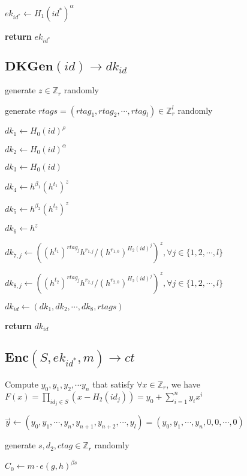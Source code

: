 \documentclass[a4paper]{article}
\begin{document}
$\textit{ek}_{\textit{id}^*} \gets H_1(\textit{id}^*)^\alpha$

\textbf{return} $\textit{ek}_{\textit{id}^*}$

\subsection{$\textbf{DKGen}(\textit{id}) \rightarrow \textit{dk}_\textit{id}$}

generate $z \in \mathbb{Z}_r$ randomly

generate $\textit{rtags} = (\textit{rtag}_1, \textit{rtag}_2, \cdots, \textit{rtag}_l) \in \mathbb{Z}_r^l$ randomly

$\textit{dk}_1 \gets H_0(\textit{id})^\rho$

$\textit{dk}_2 \gets H_0(\textit{id})^\alpha$

$\textit{dk}_3 \gets H_0(\textit{id})$

$\textit{dk}_4 \gets h^{\beta_1}(h^{t_1})^z$

$\textit{dk}_5 \gets h^{\beta_2}(h^{t_2})^z$

$\textit{dk}_6 \gets h^z$

$\textit{dk}_{7, j} \gets ((h^{t_1})^{\textit{rtag}_j}h^{r_{1, j}} / (h^{r_{1, 0}})^{H_2(\textit{id})^j})^z, \forall j \in \{1, 2, \cdots, l\}$

$\textit{dk}_{8, j} \gets ((h^{t_2})^{\textit{rtag}_j}h^{r_{2, j}} / (h^{r_{2, 0}})^{H_2(\textit{id})^j})^z, \forall j \in \{1, 2, \cdots, l\}$

$\textit{dk}_\textit{id} \gets (\textit{dk}_1, \textit{dk}_2, \cdots, \textit{dk}_8, \textit{rtags})$

\textbf{return} $\textit{dk}_\textit{id}$

\subsection{$\textbf{Enc}(S, \textit{ek}_{\textit{id}^*}, m) \rightarrow \textit{ct}$}

Compute $y_0, y_1, y_2, \cdots y_n$ that satisfy $\forall x \in \mathbb{Z}_r$, we have $F(x) = \prod\limits_{\textit{id}_j \in S} (x - H_2(\textit{id}_j)) = y_0 + \sum\limits_{i = 1}^n y_i x^i$

$\vec{y} \gets (y_0, y_1, \cdots, y_n, y_{n + 1}, y_{n + 2}, \cdots, y_l) = (y_0, y_1, \cdots, y_n, 0, 0, \cdots, 0)$

generate $s, d_2, \textit{ctag} \in \mathbb{Z}_r$ randomly

$C_0 \gets m \cdot e(g, h)^{\beta s}$
\end{document}
